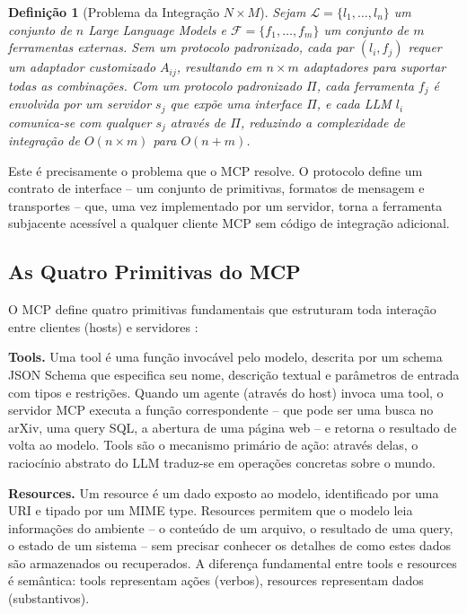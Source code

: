 \documentclass[12pt,a4paper,sumario=tradicional,openany]{abntex2}
\newtheorem{definition}{Definição}[chapter]
\begin{document}
\begin{definition}[Problema da Integração $N \times M$]
Sejam $\mathcal{L} = \{l_1, \ldots, l_n\}$ um conjunto de $n$ Large Language Models e $\mathcal{F} = \{f_1, \ldots, f_m\}$ um conjunto de $m$ ferramentas externas. Sem um protocolo padronizado, cada par $(l_i, f_j)$ requer um adaptador customizado $A_{ij}$, resultando em $n \times m$ adaptadores para suportar todas as combinações. Com um protocolo padronizado $\Pi$, cada ferramenta $f_j$ é envolvida por um servidor $s_j$ que expõe uma interface $\Pi$, e cada LLM $l_i$ comunica-se com qualquer $s_j$ através de $\Pi$, reduzindo a complexidade de integração de $O(n \times m)$ para $O(n + m)$.
\end{definition}

Este é precisamente o problema que o MCP resolve. O protocolo define um contrato de interface -- um conjunto de primitivas, formatos de mensagem e transportes -- que, uma vez implementado por um servidor, torna a ferramenta subjacente acessível a qualquer cliente MCP sem código de integração adicional.

\subsection{As Quatro Primitivas do MCP}

O MCP define quatro primitivas fundamentais que estruturam toda interação entre clientes (hosts) e servidores \cite{ayyagari2025mcp, sekarmcp2026}:

\textbf{Tools.} Uma tool é uma função invocável pelo modelo, descrita por um schema JSON Schema que especifica seu nome, descrição textual e parâmetros de entrada com tipos e restrições. Quando um agente (através do host) invoca uma tool, o servidor MCP executa a função correspondente -- que pode ser uma busca no arXiv, uma query SQL, a abertura de uma página web -- e retorna o resultado de volta ao modelo. Tools são o mecanismo primário de ação: através delas, o raciocínio abstrato do LLM traduz-se em operações concretas sobre o mundo.

\textbf{Resources.} Um resource é um dado exposto ao modelo, identificado por uma URI e tipado por um MIME type. Resources permitem que o modelo leia informações do ambiente -- o conteúdo de um arquivo, o resultado de uma query, o estado de um sistema -- sem precisar conhecer os detalhes de como estes dados são armazenados ou recuperados. A diferença fundamental entre tools e resources é semântica: tools representam ações (verbos), resources representam dados (substantivos).
\end{document}
